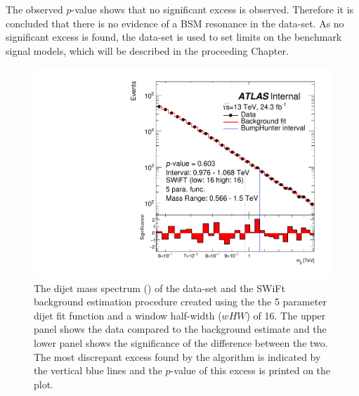 The observed \bh{} $p$-value shows that no significant excess is observed.
Therefore it is concluded that there is no evidence of a BSM resonance in the \lm{} data-set.
As no significant excess is found, the \lm{} data-set is used to set limits on the benchmark signal models,
which will be described in the proceeding Chapter.

\begin{figure}[!thb]
\captionsetup[subfigure]{aboveskip=0pt,justification=centering}
\centering
  \includegraphics[width=0.7\linewidth, angle=0]{figs/Dibjet/LowMass/FitStudy_min566/bhFit_unblind_5para_low16_high16.pdf}
\vspace{3pt}
\caption[The dijet mass spectrum (\mjj) of the \lm{} data-set and the SWiFt background estimation procedure
  created using the the 5 parameter dijet fit function and a window half-width ($wHW$) of 16.
  The most discrepant excess found by the \bh{} algorithm and the \mbox{$p$-value} of this excess are indicated on the plot.]
        {\label{fig:bhFit_lm_unblind}
   The dijet mass spectrum (\mjj) of the \lm{} data-set and the SWiFt background estimation procedure
   created using the the 5 parameter dijet fit function and a window half-width ($wHW$) of 16. 
   The upper panel shows the data compared to the background estimate and the lower panel shows the significance of the difference between the two.
   The most discrepant excess found by the \bh{} algorithm is indicated by the vertical blue lines and the \mbox{$p$-value} of this excess is printed on the plot. }
\end{figure}




